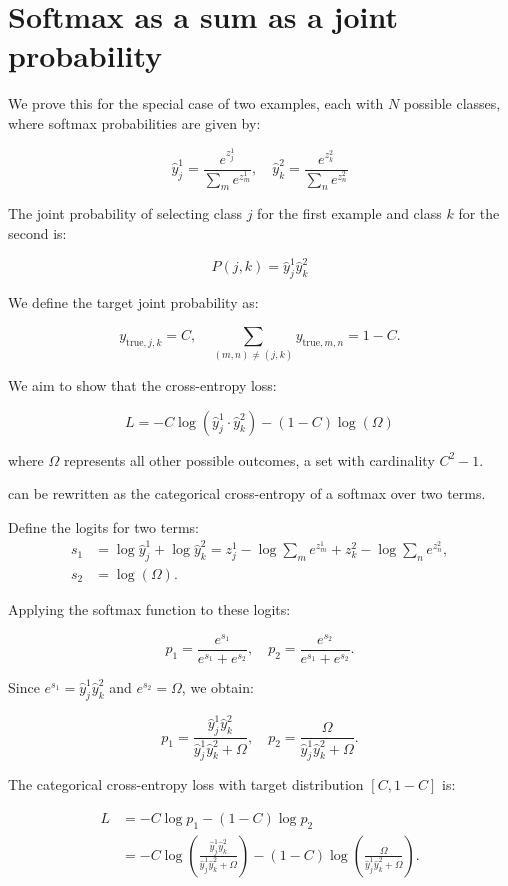 \documentclass[twoside,11pt]{article}
\begin{document}
\section{Softmax as a sum as a joint probability}
\label{app:softmax-sum-joint}

We prove this for the special case of two examples, each with $N$ 
possible classes, where softmax probabilities are given by:

\[
\hat{y}_j^1 = \frac{e^{z_j^1}}{\sum_{m} e^{z_m^1}}, \quad \hat{y}_k^2 = \frac{e^{z_k^2}}{\sum_{n} e^{z_n^2}}
\]

The joint probability of selecting class $j$ for the first example and class $k$ for the second is:

\[
P(j, k) = \hat{y}_j^1 \hat{y}_k^2
\]

We define the target joint probability as:

\[
y_{\text{true}, j, k} 
= 
C, \quad \sum_{(m,n) \neq (j,k)} y_{\text{true}, m, n} = 1 - C.
\]

We aim to show that the cross-entropy loss:

\[
L = - C \log (\hat{y}_j^1 \cdot \hat{y}_k^2) - (1 - C) \log (\Omega)
\]

where $\Omega$ represents all other possible outcomes, 
a set with cardinality $C^2 - 1$.

can be rewritten as the categorical cross-entropy of a softmax over two terms.

Define the logits for two terms:
\begin{align}
  \nonumber
  s_1 &= \log \hat{y}_j^1 + \log \hat{y}_k^2 = z_j^1 - \log \sum_m e^{z_m^1} + z_k^2 - \log \sum_n e^{z_n^2}, \\
  \nonumber
  s_2 &= \log (\Omega).
\end{align}

Applying the softmax function to these logits:

\[
p_1 = \frac{e^{s_1}}{e^{s_1} + e^{s_2}}, \quad p_2 = \frac{e^{s_2}}{e^{s_1} + e^{s_2}}.
\]

Since $e^{s_1} = \hat{y}_j^1 \hat{y}_k^2$ and $e^{s_2} = \Omega$, we obtain:

\[
p_1 = \frac{\hat{y}_j^1 \hat{y}_k^2}{\hat{y}_j^1 \hat{y}_k^2 + \Omega}, \quad
p_2 = \frac{\Omega}{\hat{y}_j^1 \hat{y}_k^2 + \Omega}.
\]

The categorical cross-entropy loss with target distribution $[C, 1 - C]$ is:

\begin{align}
  \nonumber
  L &= - C \log p_1 - (1 - C) \log p_2 \\
  \nonumber
  &= - C \log \left( \frac{\hat{y}_j^1 \hat{y}_k^2}{\hat{y}_j^1 \hat{y}_k^2 + \Omega} \right) 
        - (1 - C) \log \left( \frac{\Omega}{\hat{y}_j^1 \hat{y}_k^2 + \Omega} \right).
\end{align}
\end{document}
